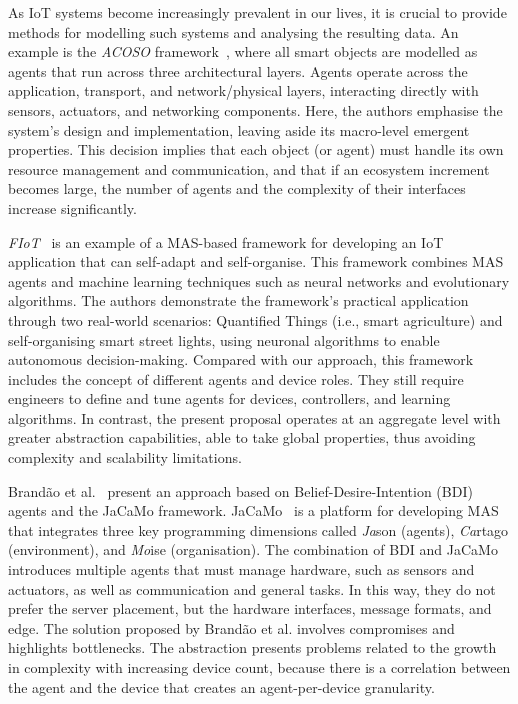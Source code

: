 \documentclass[runningheads]{llncs}
\begin{document}
As IoT systems become increasingly prevalent in our lives, it is crucial to provide methods for modelling such systems and analysing the resulting data. An example is the \emph{ACOSO} framework~\cite{FortinoRSSZ18}, where all smart objects are modelled as agents that run across three architectural layers. Agents operate across the application, transport, and network/physical layers, interacting directly with sensors, actuators, and networking components. Here, the authors emphasise the system's design and implementation, leaving aside its macro-level emergent properties. This decision implies that each object (or agent) must handle its own resource management and communication, and that if an ecosystem increment becomes large, the number of agents and the complexity of their interfaces increase significantly.

\emph{FIoT}~\cite{NascimentoL17} is an example of a MAS-based framework for developing an IoT application that can self-adapt and self-organise. This framework combines MAS agents and machine learning techniques such as neural networks and evolutionary algorithms. 
%
The authors demonstrate the framework's practical application through two real-world scenarios: Quantified Things (i.e., smart agriculture) and self-organising smart street lights, using neuronal algorithms to enable autonomous decision-making.
%
Compared with our approach, this framework includes the concept of different agents and device roles. 
%
They still require engineers to define and tune agents for devices, controllers, and learning algorithms. 
%
In contrast, the present proposal operates at an aggregate level with greater abstraction capabilities, able to take global properties, thus avoiding complexity and scalability limitations.

Brandão et al.~\cite{BrandaoLPZV21} present an approach based on Belief-Desire-Intention (BDI) agents and the JaCaMo framework. JaCaMo~\cite{BoissierBHRS13} is a platform for developing MAS that integrates three key programming dimensions called \emph{Ja}son (agents), \emph{Ca}rtago (environment), and \emph{Mo}ise (organisation). The combination of BDI and JaCaMo introduces multiple agents that must manage hardware, such as sensors and actuators, as well as communication and general tasks. In this way, they do not prefer the server placement, but the hardware interfaces, message formats, and edge. 
%
The solution proposed by Brandão et al. involves compromises and highlights bottlenecks. The abstraction presents problems related to the growth in complexity with increasing device count, because there is a correlation between the agent and the device that creates an agent-per-device granularity.
\end{document}
